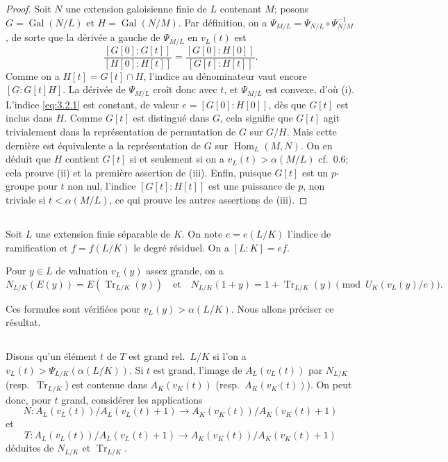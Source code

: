 \documentclass[12pt,a4paper]{article}
\theoremstyle{plain}
\theoremstyle{definition}
\theoremstyle{remark}
\DeclareMathOperator{\Hom}{Hom}
\DeclareMathOperator{\Tr}{Tr}
\providecommand{\Hom}{\operatorname{Hom}}
\providecommand{\Gal}{\operatorname{Gal}}
\providecommand{\Tr}{\operatorname{Tr}}
\begin{document}
\begin{proof}
Soit $N$ une extension galoisienne finie de $L$ contenant $M$; posons $G = \Gal(N/L)$ et $H = \Gal(N/M)$. Par d\'efinition, on a $\Psi_{M/L} = \Psi_{N/L} \circ \Psi_{N/M}^{-1}$, de sorte que la d\'eriv\'ee a gauche de $\Psi_{M/L}$ en $v_L(t)$ est
\begin{equation}\label{eq:3.2.1}
\frac{[G[0]:G[t]]}{[H[0]:H[t]]} = \frac{[G[0]:H[0]]}{[G[t]:H[t]]}.
\end{equation}
Comme on a $H[t] = G[t] \cap H$, l'indice au d\'enominateur vaut encore $[G:G[t]H]$. La d\'eriv\'ee de $\Psi_{M/L}$ cro\^it donc avec $t$, et $\Psi_{M/L}$ est convexe, d'o\`u (i). L'indice \eqref{eq:3.2.1} est constant, de valeur $e = [G[0]:H[0]]$, d\`es que $G[t]$ est inclus dans $H$. Comme $G[t]$ est distingu\'e dans $G$, cela signifie que $G[t]$ agit trivialement dans la repr\'esentation de permutation de $G$ sur $G/H$. Mais cette derni\`ere est \'equivalente a la repr\'esentation de $G$ sur $\Hom_L(M, N)$. On en d\'eduit que $H$ contient $G[t]$ si et seulement si on a $v_L(t) > \alpha(M/L)$ cf.~0.6; cela prouve (ii) et la premi\`ere assertion de (iii). Enfin, puisque $G[t]$ est un $p$-groupe pour $t$ non nul, l'indice $[G[t]:H[t]]$ est une puissance de $p$, non triviale si $t < \alpha(M/L)$, ce qui prouve les autres assertions de (iii).
\end{proof}

\subsection{}
\label{sec:3.3}

Soit $L$ une extension finie s\'eparable de $K$. On note $e = e(L/K)$ l'indice de ramification et $f = f(L/K)$ le degr\'e r\'esiduel. On a $[L:K] = ef$.

Pour $y \in L$ de valuation $v_L(y)$ assez grande, on a
\[
N_{L/K}(E(y)) = E(\Tr_{L/K}(y)) \quad \text{et} \quad N_{L/K}(1+y) = 1 + \Tr_{L/K}(y) \pmod{U_K(v_L(y)/e)}.
\]

Ces formules sont v\'erifi\'ees pour $v_L(y) > \alpha(L/K)$. Nous allons pr\'eciser ce r\'esultat.

\subsection{}
\label{sec:3.4}

Disons qu'un \'el\'ement $t$ de $T$ est grand rel.~$L/K$ si l'on a $v_L(t) > \Psi_{L/K}(\alpha(L/K))$. Si $t$ est grand, l'image de $A_L(v_L(t))$ par $N_{L/K}$ (resp.~$\Tr_{L/K}$) est contenue dans $A_K(v_K(t))$ (resp.~$A_K(v_K(t))$). On peut donc, pour $t$ grand, consid\'erer les applications
\[
N: A_L(v_L(t))/A_L(v_L(t)+1) \to A_K(v_K(t))/A_K(v_K(t)+1)
\]
et
\[
T: A_L(v_L(t))/A_L(v_L(t)+1) \to A_K(v_K(t))/A_K(v_K(t)+1)
\]
d\'eduites de $N_{L/K}$ et $\Tr_{L/K}$.
\end{document}
